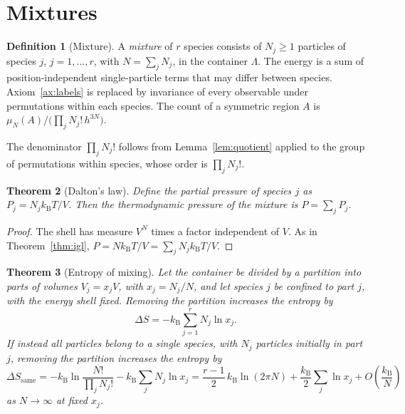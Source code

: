 \documentclass[11pt,a4paper]{article}
\newtheorem{theorem}{Theorem}[section]
\theoremstyle{definition}
\newtheorem{definition}[theorem]{Definition}
\theoremstyle{remark}
\newcommand{\kB}{k_{\mathrm{B}}}
\begin{document}
\section{Mixtures}
\label{sec:mixtures}

\begin{definition}[Mixture]
\label{def:mixture}
A \emph{mixture} of $r$ species consists of $N_j\ge1$ particles of species $j$, $j=1,\dots,r$, with $N=\sum_jN_j$, in the container $\Lambda$.
The energy is a sum of position-independent single-particle terms that may differ between species.
Axiom~\ref{ax:labels} is replaced by invariance of every observable under permutations within each species.
The count of a symmetric region $A$ is $\mu_N(A)/\bigl(\prod_jN_j!\,h^{3N}\bigr)$.
\end{definition}

The denominator $\prod_jN_j!$ follows from Lemma~\ref{lem:quotient} applied to the group of permutations within species, whose order is $\prod_jN_j!$.

\begin{theorem}[Dalton's law]
\label{thm:dalton}
Define the \emph{partial pressure} of species $j$ as $P_j=N_j\kB T/V$.
Then the thermodynamic pressure of the mixture is $P=\sum_jP_j$.
\end{theorem}

\begin{proof}
The shell has measure $V^{N}$ times a factor independent of $V$.
As in Theorem~\ref{thm:igl}, $P=N\kB T/V=\sum_jN_j\kB T/V$.
\end{proof}

\begin{theorem}[Entropy of mixing]
\label{thm:mixing}
Let the container be divided by a partition into parts of volumes $V_j=x_jV$, with $x_j=N_j/N$, and let species $j$ be confined to part $j$, with the energy shell fixed.
Removing the partition increases the entropy by
\begin{equation}
\Delta S=-\kB\sum_{j=1}^{r}N_j\ln x_j.
\label{eq:mixing}
\end{equation}
If instead all particles belong to a single species, with $N_j$ particles initially in part $j$, removing the partition increases the entropy by
\begin{equation}
\Delta S_{\mathrm{same}}=-\kB\ln\frac{N!}{\prod_jN_j!}-\kB\sum_jN_j\ln x_j
=\frac{r-1}{2}\,\kB\ln(2\pi N)+\frac{\kB}{2}\sum_j\ln x_j+O\!\left(\frac{\kB}{N}\right)
\label{eq:mixing-same}
\end{equation}
as $N\to\infty$ at fixed $x_j$.
\end{theorem}
\end{document}
